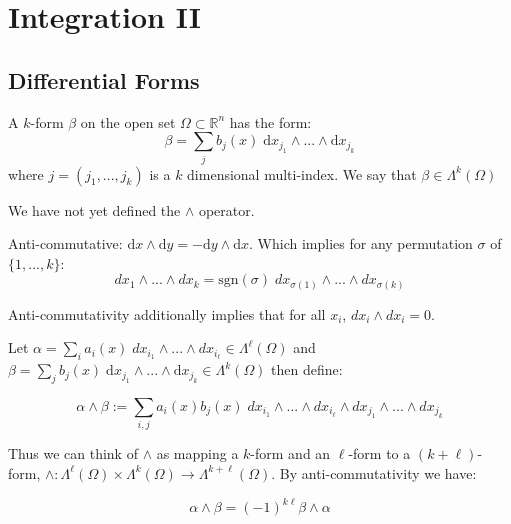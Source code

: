 \chapter{Integration II}


%
%

\section{Differential Forms}

\begin{definition}
A $k$-form $\beta$ on the open set $\Omega \subset \mathbb{R}^n$ has the form:
\begin{equation}
\beta = \sum_j b_j(x) \; \text{d} x_{j_1} \wedge ... \wedge \text{d} x_{j_k}
\end{equation}
where $j=(j_1, ..., j_k)$ is a $k$ dimensional multi-index. We say that $\beta \in \Lambda^k(\Omega)$
\end{definition}

We have not yet defined the $\wedge$ operator.

Anti-commutative: $\text{d} x \wedge \text{d} y = - \text{d}y \wedge \text{d} x$. 
Which implies for any permutation $\sigma$ of $\{1,...,k\}$:
\begin{equation}
dx_1 \wedge ... \wedge dx_k = \text{sgn}(\sigma) \; dx_{\sigma(1)} \wedge ... \wedge dx_{\sigma(k)}
\end{equation}

Anti-commutativity additionally implies that for all $x_i$, $dx_i \wedge dx_i = 0$. 

Let $\alpha = \sum_i a_i(x) \; dx_{i_1} \wedge ... \wedge dx_{i_\ell} \in \Lambda^\ell(\Omega)$ and
$\beta = \sum_j b_j(x) \; \text{d} x_{j_1} \wedge ... \wedge \text{d} x_{j_k} \in \Lambda^k(\Omega)$ then define:

\begin{equation}
\alpha \wedge \beta  := \sum_{i,j} a_i(x) b_j(x) \; dx_{i_1} \wedge ... \wedge dx_{i_\ell} \wedge dx_{j_1} \wedge ... \wedge dx_{j_k}
\end{equation}

Thus we can think of $\wedge$ as mapping a $k$-form and an $\ell$-form to a $(k+\ell)$-form, $\wedge : \Lambda^\ell(\Omega) \times \Lambda^k (\Omega) \to \Lambda^{k+\ell} (\Omega)$. By anti-commutativity we have:

\begin{equation}
\alpha \wedge \beta = (-1)^{k \ell} \beta \wedge \alpha
\end{equation}


